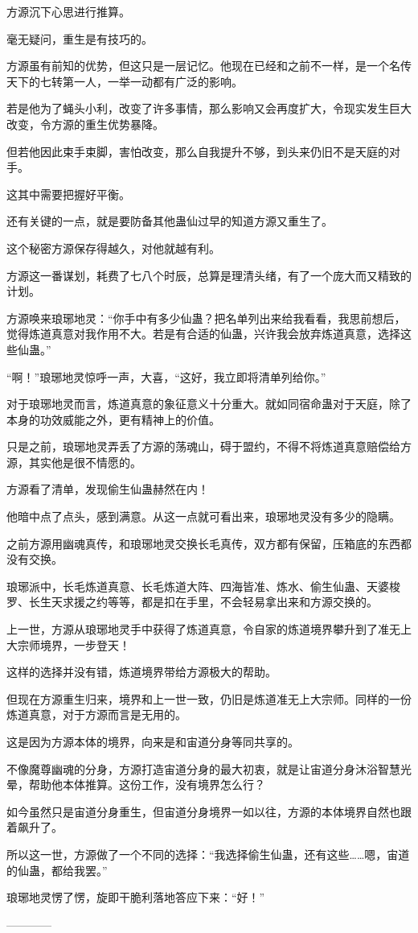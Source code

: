 \begin{this_body}
方源沉下心思进行推算。

毫无疑问，重生是有技巧的。

方源虽有前知的优势，但这只是一层记忆。他现在已经和之前不一样，是一个名传天下的七转第一人，一举一动都有广泛的影响。

若是他为了蝇头小利，改变了许多事情，那么影响又会再度扩大，令现实发生巨大改变，令方源的重生优势暴降。

但若他因此束手束脚，害怕改变，那么自我提升不够，到头来仍旧不是天庭的对手。

这其中需要把握好平衡。

还有关键的一点，就是要防备其他蛊仙过早的知道方源又重生了。

这个秘密方源保存得越久，对他就越有利。

方源这一番谋划，耗费了七八个时辰，总算是理清头绪，有了一个庞大而又精致的计划。

方源唤来琅琊地灵：“你手中有多少仙蛊？把名单列出来给我看看，我思前想后，觉得炼道真意对我作用不大。若是有合适的仙蛊，兴许我会放弃炼道真意，选择这些仙蛊。”

“啊！”琅琊地灵惊呼一声，大喜，“这好，我立即将清单列给你。”

对于琅琊地灵而言，炼道真意的象征意义十分重大。就如同宿命蛊对于天庭，除了本身的功效威能之外，更有精神上的价值。

只是之前，琅琊地灵弄丢了方源的荡魂山，碍于盟约，不得不将炼道真意赔偿给方源，其实他是很不情愿的。

方源看了清单，发现偷生仙蛊赫然在内！

他暗中点了点头，感到满意。从这一点就可看出来，琅琊地灵没有多少的隐瞒。

之前方源用幽魂真传，和琅琊地灵交换长毛真传，双方都有保留，压箱底的东西都没有交换。

琅琊派中，长毛炼道真意、长毛炼道大阵、四海皆准、炼水、偷生仙蛊、天婆梭罗、长生天求援之约等等，都是扣在手里，不会轻易拿出来和方源交换的。

上一世，方源从琅琊地灵手中获得了炼道真意，令自家的炼道境界攀升到了准无上大宗师境界，一步登天！

这样的选择并没有错，炼道境界带给方源极大的帮助。

但现在方源重生归来，境界和上一世一致，仍旧是炼道准无上大宗师。同样的一份炼道真意，对于方源而言是无用的。

这是因为方源本体的境界，向来是和宙道分身等同共享的。

不像魔尊幽魂的分身，方源打造宙道分身的最大初衷，就是让宙道分身沐浴智慧光晕，帮助他本体推算。这份工作，没有境界怎么行？

如今虽然只是宙道分身重生，但宙道分身境界一如以往，方源的本体境界自然也跟着飙升了。

所以这一世，方源做了一个不同的选择：“我选择偷生仙蛊，还有这些……嗯，宙道的仙蛊，都给我罢。”

琅琊地灵愣了愣，旋即干脆利落地答应下来：“好！”

------------

\end{this_body}

